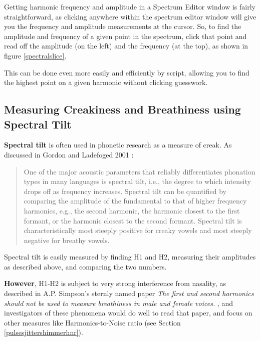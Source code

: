 Getting harmonic frequency and amplitude in a Spectrum Editor window is
fairly straightforward, as clicking anywhere within the spectrum editor
window will give you the frequency and amplitude measurements at the
cursor. So, to find the amplitude and frequency of a given point in the
spectrum, click that point and read off the amplitude (on the left) and
the frequency (at the top), as shown in figure \ref{spectralslice}.

This can be done even more easily and efficiently by script, allowing
you to find the highest point on a given harmonic without clicking
guesswork.

\hypertarget{measuring-creakiness-and-breathiness-using-spectral-tilt}{%
\subsection{Measuring Creakiness and Breathiness using Spectral
Tilt}\label{measuring-creakiness-and-breathiness-using-spectral-tilt}}

\label{creakybreathy}

\textbf{Spectral tilt} is often used in phonetic research as a measure
of creak. As discussed in Gordon and Ladefoged 2001
\cite{Gordon:2001um}:

\begin{quote}
One of the major acoustic parameters that reliably differentiates
phonation types in many languages is spectral tilt, i.e., the degree to
which intensity drops off as frequency increases. Spectral tilt can be
quantified by comparing the amplitude of the fundamental to that of
higher frequency harmonics, e.g., the second harmonic, the harmonic
closest to the first formant, or the harmonic closest to the second
formant. Spectral tilt is characteristically most steeply positive for
creaky vowels and most steeply negative for breathy vowels.
\end{quote}

Spectral tilt is easily measured by finding H1 and H2, measuring their
amplitudes as described above, and comparing the two numbers.

\textbf{However}, H1-H2 is subject to very strong interference from
nasality, as described in A.P. Simpson's sternly named paper \emph{The
first and second harmonics should not be used to measure breathiness in
male and female voices.} \cite{simpson2012first}, and investigators of
these phenomena would do well to read that paper, and focus on other
measures like Harmonics-to-Noise ratio (see Section
\ref{pulsesjittershimmerhnr}).

